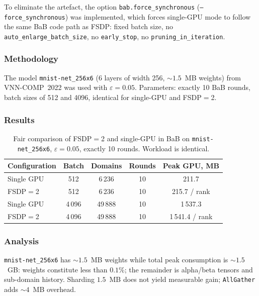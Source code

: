 To eliminate the artefact, the option \texttt{bab.force\_synchronous}
(\texttt{--force\_synchronous}) was implemented, which forces single-GPU mode to
follow the same BaB code path as FSDP: fixed batch size, no
\texttt{auto\_enlarge\_batch\_size}, no \texttt{early\_stop}, no
\texttt{pruning\_in\_iteration}.

\subsubsection{Methodology}

The model \texttt{mnist-net\_256x6} (6 layers of width 256,
${\sim}1.5$~MB weights) from VNN-COMP~2022 was used with $\varepsilon = 0.05$.
Parameters: exactly 10 BaB rounds, batch sizes of 512 and 4096, identical for
single-GPU and FSDP$=$2.

\subsubsection{Results}

\begin{table}[htbp]
\centering
\caption{Fair comparison of FSDP$=$2 and single-GPU in BaB on
\texttt{mnist-net\_256x6}, $\varepsilon{=}0.05$, exactly 10 rounds.
Workload is identical.}
\label{tab:fsdp-bab}
\begin{tabular}{lcccc}
\toprule
Configuration & Batch & Domains & Rounds & Peak GPU, MB \\
\midrule
Single GPU  &   512 &   6\,236 & 10 &     211.7 \\
FSDP$=$2    &   512 &   6\,236 & 10 & 215.7 / rank \\
Single GPU  & 4\,096 &  49\,888 & 10 &   1\,537.3 \\
FSDP$=$2    & 4\,096 &  49\,888 & 10 & 1\,541.4 / rank \\
\bottomrule
\end{tabular}
\end{table}

\subsubsection{Analysis}

\texttt{mnist-net\_256x6} has ${\sim}1.5$~MB weights while total peak
consumption is ${\sim}1.5$~GB: weights constitute less than $0.1\%$; the
remainder is alpha/beta tensors and sub-domain history. Sharding $1.5$~MB does
not yield measurable gain; \texttt{AllGather} adds ${\sim}4$~MB overhead.

